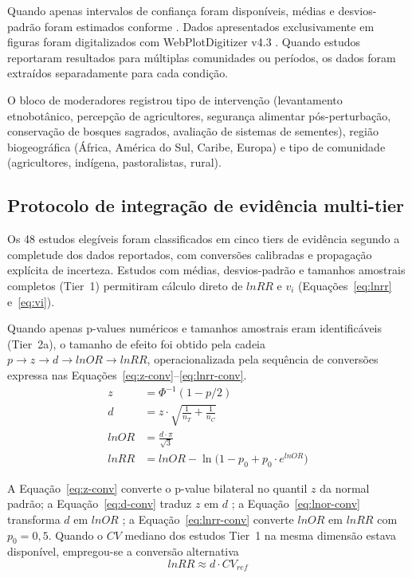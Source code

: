 \documentclass[12pt,a4paper]{article}
\begin{document}
\noindent Quando apenas intervalos de confiança foram disponíveis, médias e desvios-padrão foram estimados conforme \citet{Betancur2022}. Dados apresentados exclusivamente em figuras foram digitalizados com WebPlotDigitizer v4.3 \citep{Rohatgi2020}. Quando estudos reportaram resultados para múltiplas comunidades ou períodos, os dados foram extraídos separadamente para cada condição.

O bloco de moderadores registrou tipo de intervenção (levantamento etnobotânico, percepção de agricultores, segurança alimentar pós-perturbação, conservação de bosques sagrados, avaliação de sistemas de sementes), região biogeográfica (África, América do Sul, Caribe, Europa) e tipo de comunidade (agricultores, indígena, pastoralistas, rural).

\subsection{Protocolo de integração de evidência multi-tier}
\label{sec:multitier}

Os 48 estudos elegíveis foram classificados em cinco tiers de evidência segundo a completude dos dados reportados, com conversões calibradas e propagação explícita de incerteza. Estudos com médias, desvios-padrão e tamanhos amostrais completos (Tier~1) permitiram cálculo direto de $lnRR$ e $v_i$ (Equações~\ref{eq:lnrr} e~\ref{eq:vi}).

Quando apenas p-values numéricos e tamanhos amostrais eram identificáveis (Tier~2a), o tamanho de efeito foi obtido pela cadeia $p \rightarrow z \rightarrow d \rightarrow lnOR \rightarrow lnRR$, operacionalizada pela sequência de conversões expressa nas Equações~\ref{eq:z-conv}--\ref{eq:lnrr-conv}.
%
\begin{align}
z &= \Phi^{-1}(1 - p/2) \label{eq:z-conv} \\
d &= z \cdot \sqrt{\frac{1}{n_T} + \frac{1}{n_C}} \label{eq:d-conv} \\
lnOR &= \frac{d \cdot \pi}{\sqrt{3}} \label{eq:lnor-conv} \\
lnRR &= lnOR - \ln\!\bigl(1 - p_0 + p_0 \cdot e^{lnOR}\bigr) \label{eq:lnrr-conv}
\end{align}

\noindent A Equação~\ref{eq:z-conv} converte o p-value bilateral no quantil $z$ da normal padrão; a Equação~\ref{eq:d-conv} traduz $z$ em $d$ \citep{Borenstein2009}; a Equação~\ref{eq:lnor-conv} transforma $d$ em $lnOR$ \citep{Hasselblad1995}; a Equação~\ref{eq:lnrr-conv} converte $lnOR$ em $lnRR$ \citep{Zhang1998} com $p_0 = 0{,}5$. Quando o $CV$ mediano dos estudos Tier~1 na mesma dimensão estava disponível, empregou-se a conversão alternativa
%
\begin{equation}
lnRR \approx d \cdot CV_{ref}
\label{eq:lnrr-cv}
\end{equation}
\end{document}
